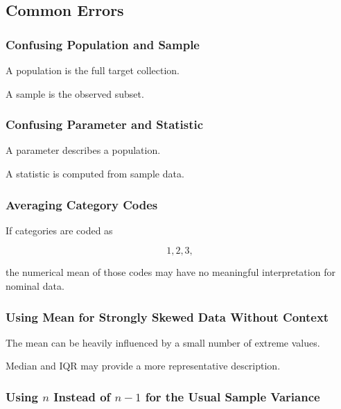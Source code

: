 \subsection{Common Errors}
\label{subsec:descriptive-statistics-common-errors}

\subsubsection{Confusing Population and Sample}

A population is the full target collection.

A sample is the observed subset.

\subsubsection{Confusing Parameter and Statistic}

A parameter describes a population.

A statistic is computed from sample data.

\subsubsection{Averaging Category Codes}

If categories are coded as

\[
1,2,3,
\]

the numerical mean of those codes may have no meaningful interpretation
for nominal data.

\subsubsection{Using Mean for Strongly Skewed Data Without Context}

The mean can be heavily influenced by a small number of extreme values.

Median and IQR may provide a more representative description.

\subsubsection{Using \(n\) Instead of \(n-1\) for the Usual Sample Variance}

